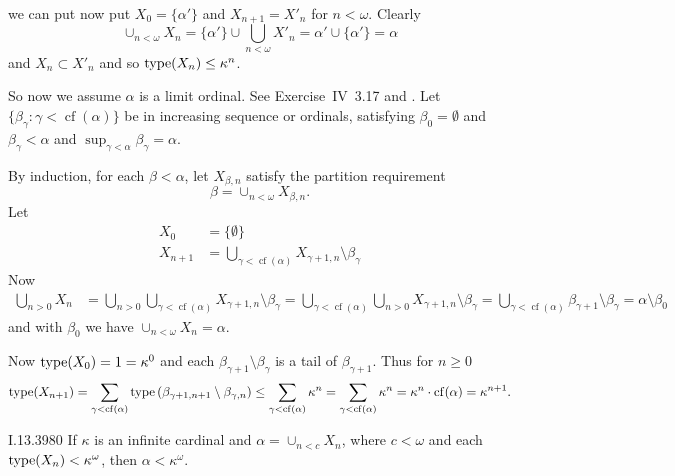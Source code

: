 we can put now put \(X_0 = \{\alpha'\}\)
and \(X_{n+1} = X'_n\) for \(n<\omega\).
Clearly
\begin{equation*}
\cup_{n < \omega} X_n = \{\alpha'\} \cup \bigcup_{n < \omega} X'_n =
\alpha' \cup \{\alpha'\} = \alpha
\end{equation*}
and \(X_n \subset X'_n\) and so \(\mathop{\mathrm{type}}(X_n) \leq \kappa^n\).

\newcommand{\cfalpha}{\ensuremath{\operatorname{cf}(\alpha)}}
So now we assume \(\alpha\) is a limit ordinal.
See \cite{Levy2002Basic} Exercise~IV~3.17
and \cite{wikipedia:Milner:Rado}.
Let \(\{\beta_\gamma: \gamma < \cfalpha\}\) be in increasing
sequence or ordinals, satisfying \(\beta_0 = \emptyset\)
and \(\beta_\gamma < \alpha\)
and \(\sup_{\gamma<\alpha} \beta_\gamma = \alpha\).

By induction,
for each \(\beta < \alpha\),
let \(X_{\beta,n}\) satisfy the partition requirement
\begin{equation*}
\beta = \cup_{n<\omega} X_{\beta,n}.
\end{equation*}
Let
\begin{align*}
X_0 &= \{\emptyset\} \\
X_{n+1} &= \bigcup_{\gamma < \cfalpha} X_{\gamma+1,n} \setminus \beta_\gamma
\end{align*}
Now
\begin{align*}
\bigcup_{n>0} X_n
 &= \bigcup_{n>0} \bigcup_{\gamma < \cfalpha} X_{\gamma+1,n} \setminus \beta_\gamma
  = \bigcup_{\gamma < \cfalpha} \bigcup_{n>0} X_{\gamma+1,n} \setminus \beta_\gamma
  = \bigcup_{\gamma < \cfalpha} \beta_{\gamma+1} \setminus \beta_\gamma
  = \alpha \setminus \beta_0
\end{align*}
and with \(\beta_0\) we have \(\cup_{n<\omega} X_n = \alpha\).

Now \(\mathop{\mathrm{type}}(X_0) = 1 = \kappa^0\)
and each \(\beta_{\gamma+1} \setminus \beta_\gamma\) is 
a tail of \(\beta_{\gamma+1}\). Thus for \(n\geq 0\)
\begin{equation*}
\type(X_{n+1})
= \sum_{\gamma < \cfalpha}
    \type\left(\beta_{\gamma+1,n+1} \setminus \beta_{\gamma,n}\right)
\leq \sum_{\gamma < \cfalpha} \kappa^n
= \sum_{\gamma < \cfalpha} \kappa^n
= \kappa^n \cdot \cfalpha
= \kappa^{n+1}.
\end{equation*}

\begin{lexcopy}{I.13.39}{80}
If \(\kappa\) is an infinite cardinal and \(\alpha = \cup_{n < c}X_n\),
where \(c < \omega\)
and each \(\mathop{\mathrm{type}}(X_n) < \kappa^\omega\), then \(\alpha < \kappa^\omega\).
\end{lexcopy}


